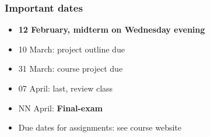 \begin{frame}\frametitle{Important dates}
	\begin{itemize}
		\item	{\color{myRed} \textbf{12 February, midterm on Wednesday evening}} \\{\color{myOrange}{Notify me of clashes this week!}}
		\item	10 March: project outline due
		\item	31 March: course project due
		\item	07 April: last, review class
		\item	NN April: \textbf{Final-exam}
	\end{itemize}
	\begin{itemize}
		\item	Due dates for assignments: see course website
	\end{itemize}
\end{frame}